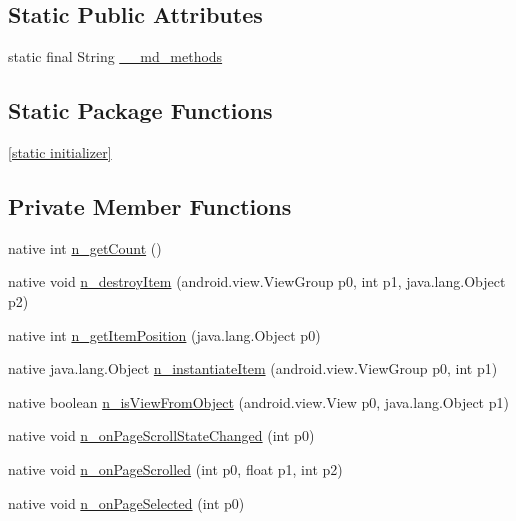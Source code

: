 \subsection*{Static Public Attributes}
\begin{CompactItemize}
\item 
static final String \hyperlink{classmd5b60ffeb829f638581ab2bb9b1a7f4f3f_1_1_carousel_page_adapter_af2a268eb1b8b79578e2ee7590f20521}{\_\-\_\-md\_\-methods}
\end{CompactItemize}
\subsection*{Static Package Functions}
\begin{CompactItemize}
\item 
\hyperlink{classmd5b60ffeb829f638581ab2bb9b1a7f4f3f_1_1_carousel_page_adapter_8bcd4cba6272a77c65f448167da6b36d}{\mbox{[}static initializer\mbox{]}}
\end{CompactItemize}
\subsection*{Private Member Functions}
\begin{CompactItemize}
\item 
native int \hyperlink{classmd5b60ffeb829f638581ab2bb9b1a7f4f3f_1_1_carousel_page_adapter_c88e3ef26c87beaabd0db5798f9b74ef}{n\_\-getCount} ()
\item 
native void \hyperlink{classmd5b60ffeb829f638581ab2bb9b1a7f4f3f_1_1_carousel_page_adapter_777f131e0a7296c7c5b945facf6c3f4e}{n\_\-destroyItem} (android.view.ViewGroup p0, int p1, java.lang.Object p2)
\item 
native int \hyperlink{classmd5b60ffeb829f638581ab2bb9b1a7f4f3f_1_1_carousel_page_adapter_75d9241e07e6bf015c0511c0906a7328}{n\_\-getItemPosition} (java.lang.Object p0)
\item 
native java.lang.Object \hyperlink{classmd5b60ffeb829f638581ab2bb9b1a7f4f3f_1_1_carousel_page_adapter_ccd3c513ad78492649a0f8621015a5a0}{n\_\-instantiateItem} (android.view.ViewGroup p0, int p1)
\item 
native boolean \hyperlink{classmd5b60ffeb829f638581ab2bb9b1a7f4f3f_1_1_carousel_page_adapter_7750bcfc405f4a308f76c5546d8d0e40}{n\_\-isViewFromObject} (android.view.View p0, java.lang.Object p1)
\item 
native void \hyperlink{classmd5b60ffeb829f638581ab2bb9b1a7f4f3f_1_1_carousel_page_adapter_721d65362e35523ffb3bfeb92508d0df}{n\_\-onPageScrollStateChanged} (int p0)
\item 
native void \hyperlink{classmd5b60ffeb829f638581ab2bb9b1a7f4f3f_1_1_carousel_page_adapter_08a0bf1136d5dff399b8fd27b55b31d3}{n\_\-onPageScrolled} (int p0, float p1, int p2)
\item 
native void \hyperlink{classmd5b60ffeb829f638581ab2bb9b1a7f4f3f_1_1_carousel_page_adapter_731cc671e0f6930df1ae12d2bc0c00f9}{n\_\-onPageSelected} (int p0)
\end{CompactItemize}

